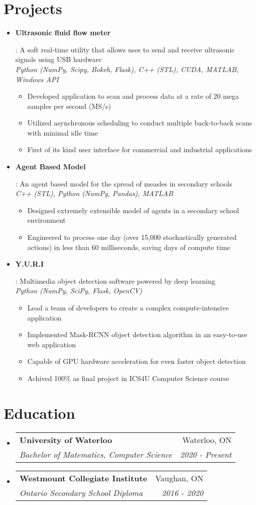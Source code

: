 \documentclass[letterpaper,10pt]{article}
\makeatletter
\newcommand{\resumeItem}[2]{
  \item\small{
    \textbf{#1}{: #2 \vspace{-2pt}}
  }
}
\newcommand{\resumeSubheading}[4]{
  \vspace{-1pt}\item[]
  \begin{tabular*}{0.98\textwidth}{l@{\extracolsep{\fill}}r}
      \hspace{-10pt}\textbf{#1} & #2 \\
      \hspace{-10pt}\textit{\small#3} & \textit{\small #4} \\
    \end{tabular*}\vspace{-5pt}
}
\newcommand{\resumeSubItem}[2]{\resumeItem{#1}{#2}\vspace{-4pt}}
\newcommand{\resumeSubHeadingListStart}{\begin{itemize}[leftmargin=*]}
\newcommand{\resumeSubHeadingListEnd}{\end{itemize}}
\newcommand{\shorterSection}[1]{\vspace{-10pt}\section{#1}}
\makeatother
\begin{document}
\shorterSection{Projects}
  \resumeSubHeadingListStart
    \resumeSubItem{Ultrasonic fluid flow meter}
     {A soft real-time utility that allows uses to send and receive ultrasonic signals using USB hardware \\
     \emph{Python (NumPy, Scipy, Bokeh, Flask), C++ (STL), CUDA, MATLAB, Windows API}
        \vspace{-5pt}
        \begin{itemize}
            \item Developed application to scan and process data at a rate of 20 mega samples per second (MS/s)
            \item Utilized asynchronous scheduling to conduct multiple back-to-back scans with minimal idle time
            \item First of its kind user interface for commercial and industrial applications
        \end{itemize}
     }
     \resumeSubItem{Agent Based Model}
     {An agent based model for the spread of measles in secondary schools \\
     \emph{C++ (STL), Python (NumPy, Pandas), MATLAB}
        \vspace{-5pt}
        \begin{itemize}
            \item Designed extremely extensible model of agents in a secondary school environment
            \item Engineered to process one day (over 15,000 stochastically generated actions) in less than 60 milliseconds, saving days of compute time
        \end{itemize}
     }
     \resumeSubItem{Y.U.R.I}
     {Multimedia object detection software powered by deep learning \\
     \emph{Python (NumPy, SciPy, Flask, OpenCV)}
        \vspace{-5pt}
        \begin{itemize}
            \item Lead a team of developers to create a complex compute-intensive application
            \item Implemented Mask-RCNN object detection algorithm in an easy-to-use web application
            \item Capable of GPU hardware acceleration for even faster object detection
            \item Achived 100\% as final project in ICS4U Computer Science course 
        \end{itemize}
     }
  \resumeSubHeadingListEnd

\shorterSection{Education}
  \resumeSubHeadingListStart
    \resumeSubheading
      {University of Waterloo}{Waterloo, ON}
      {Bachelor of Matematics, Computer Science}{2020 - Present}{}
    \resumeSubheading
      {Westmount Collegiate Institute}{Vaughan, ON}
      {Ontario Secondary School Diploma}{2016 - 2020}{}
   
  \resumeSubHeadingListEnd
\end{document}
